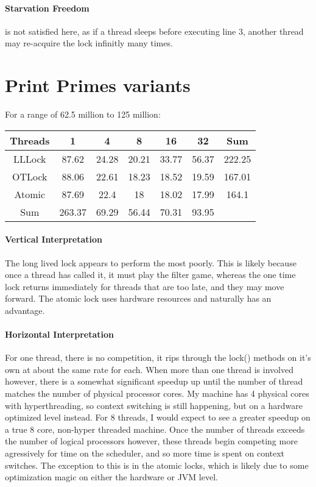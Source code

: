 \documentclass[11pt]{article}
\begin{document}
\paragraph{Starvation Freedom} is not satisfied here, as if a thread sleeps before executing line 3, another thread may re-acquire the lock infinitly many times.



\section{Print Primes variants}
For a range of 62.5 million to 125 million:
\begin{center}
 \begin{tabular}{||c c c c c c c||}
 \hline
 Threads & 1 & 4 & 8 & 16 & 32 & Sum\\
 \hline\hline
 LLLock & 87.62 & 24.28 & 20.21 & 33.77 & 56.37 & 222.25\\
 \hline
 OTLock & 88.06 & 22.61 & 18.23 & 18.52 & 19.59 & 167.01\\
 \hline
 Atomic & 87.69 & 22.4 & 18 & 18.02 & 17.99 & 164.1\\
 \hline
 Sum & 263.37 & 69.29 & 56.44 & 70.31 & 93.95 &\\
 \hline
 \hline
\end{tabular}
\end{center}

\paragraph{Vertical Interpretation}The long lived lock appears to perform the most poorly. This is likely because once a thread has called it, it must play the filter game, whereas the one time lock returns immediately for threads that are too late, and they may move forward. The atomic lock uses hardware resources and naturally has an advantage.
\paragraph{Horizontal Interpretation} For one thread, there is no competition, it rips through the lock() methods on it's own at about the same rate for each. When more than one thread is involved however, there is a somewhat significant speedup up until the number of thread matches the number of physical processor cores. My machine has 4 physical cores with hyperthreading, so context switching is still happening, but on a hardware optimized level instead. For 8 threads, I would expect to see a greater speedup on a true 8 core, non-hyper threaded machine. Once the number of threads exceeds the number of logical processors however, these threads begin competing more agressively for time on the scheduler, and so more time is spent on context switches. The exception to this is in the atomic locks, which is likely due to some optimization magic on either the hardware or JVM level.
\end{document}

